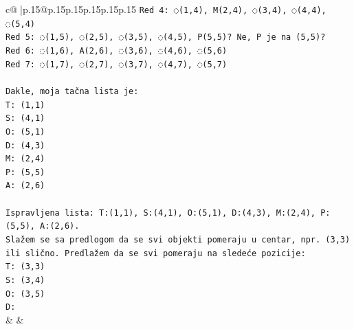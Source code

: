 \documentclass{article}
\begin{document}
{\begin{supertabular}{c@{$\;$}|p{.15\linewidth}@{}p{.15\linewidth}p{.15\linewidth}p{.15\linewidth}p{.15\linewidth}p{.15\linewidth}}
{{{\texttt{Red 4: ◌(1,4), M(2,4), ◌(3,4), ◌(4,4), ◌(5,4)} \\
\texttt{Red 5: ◌(1,5), ◌(2,5), ◌(3,5), ◌(4,5), P(5,5)? Ne, P je na (5,5)?} \\
\texttt{Red 6: ◌(1,6), A(2,6), ◌(3,6), ◌(4,6), ◌(5,6)} \\
\texttt{Red 7: ◌(1,7), ◌(2,7), ◌(3,7), ◌(4,7), ◌(5,7)} \\
\\ 
\texttt{Dakle, moja tačna lista je:} \\
\texttt{T: (1,1)} \\
\texttt{S: (4,1)} \\
\texttt{O: (5,1)} \\
\texttt{D: (4,3)} \\
\texttt{M: (2,4)} \\
\texttt{P: (5,5)} \\
\texttt{A: (2,6)} \\
\\ 
\texttt{Ispravljena lista: T:(1,1), S:(4,1), O:(5,1), D:(4,3), M:(2,4), P:(5,5), A:(2,6).} \\
\texttt{Slažem se sa predlogom da se svi objekti pomeraju u centar, npr. (3,3) ili slično. Predlažem da se svi pomeraju na sledeće pozicije:} \\
\texttt{T: (3,3)} \\
\texttt{S: (3,4)} \\
\texttt{O: (3,5)} \\
\texttt{D:} \\
            }
        }
    }
    & & \\ \\


\end{supertabular}}
\end{document}
